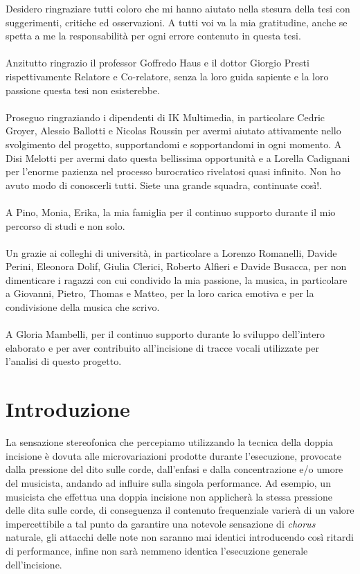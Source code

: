 \documentclass[12pt]{report}
\begin{document}
Desidero ringraziare tutti coloro che mi hanno aiutato nella stesura della tesi con suggerimenti, critiche ed osservazioni. A tutti voi va la mia gratitudine, anche se spetta a me la responsabilità per ogni errore contenuto in questa tesi.\\
\\
Anzitutto ringrazio il professor Goffredo Haus e il dottor Giorgio Presti rispettivamente Relatore e Co-relatore, senza la loro guida sapiente e la loro passione questa tesi non esisterebbe.\\
\\
Proseguo ringraziando i dipendenti di IK Multimedia, in particolare Cedric Groyer, Alessio Ballotti e Nicolas Roussin per avermi aiutato attivamente nello svolgimento del progetto, supportandomi e sopportandomi in ogni momento. A Disi Melotti per avermi dato questa bellissima opportunità e a Lorella Cadignani per l'enorme pazienza nel processo burocratico rivelatosi quasi infinito. Non ho avuto modo di conoscerli tutti. Siete una grande squadra, continuate così!.\\
\\
A Pino, Monia, Erika, la mia famiglia per il continuo supporto durante il mio percorso di studi e non solo.\\
\\
Un grazie ai colleghi di università, in particolare a Lorenzo Romanelli, Davide Perini, Eleonora Dolif, Giulia Clerici, Roberto Alfieri e Davide Busacca, per non dimenticare i ragazzi con cui condivido la mia passione, la musica, in particolare a Giovanni, Pietro, Thomas e Matteo, per la loro carica emotiva e per la condivisione della musica che scrivo.\\
\\
A Gloria Mambelli, per il continuo supporto durante lo sviluppo dell'intero elaborato e per aver contribuito all'incisione di tracce vocali utilizzate per l'analisi di questo progetto.
\\
\afterpreface

\chapter{Introduzione}
\label{cap1}
	La sensazione stereofonica che percepiamo utilizzando la tecnica della doppia incisione è dovuta alle microvariazioni prodotte durante l'esecuzione, provocate dalla pressione del dito sulle corde, dall'enfasi e dalla concentrazione e/o umore del musicista, andando ad influire sulla singola performance. Ad esempio, un musicista che effettua una doppia incisione non applicherà la stessa pressione delle dita sulle corde, di conseguenza il contenuto frequenziale varierà di un valore impercettibile a tal punto da garantire una notevole sensazione di {\itshape chorus} naturale, gli attacchi delle note non saranno mai identici introducendo così ritardi di performance, infine non sarà nemmeno identica l'esecuzione generale dell'incisione.\\ 
\end{document}
